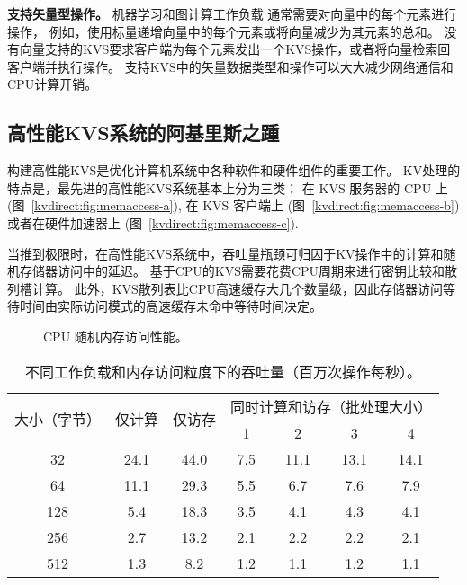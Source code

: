 \textbf {支持矢量型操作。}
机器学习和图计算工作负载\cite {li2014scaling,shao2013trinity,xiao17tux2} 通常需要对向量中的每个元素进行操作，
例如，使用标量递增向量中的每个元素或将向量减少为其元素的总和。
没有向量支持的KVS要求客户端为每个元素发出一个KVS操作，或者将向量检索回客户端并执行操作。
支持KVS中的矢量数据类型和操作可以大大减少网络通信和CPU计算开销。

\subsection{高性能KVS系统的阿基里斯之踵}
\label{kvdirect:sec:state-of-the-art-kvs}

构建高性能KVS是优化计算机系统中各种软件和硬件组件的重要工作。
KV处理的特点是，最先进的高性能KVS系统基本上分为三类：
在 KVS 服务器的 CPU 上
(图~\ref{kvdirect:fig:memaccess-a}),
在 KVS 客户端上
(图~\ref{kvdirect:fig:memaccess-b})
或者在硬件加速器上
(图~\ref{kvdirect:fig:memaccess-c}).

当推到极限时，在高性能KVS系统中，吞吐量瓶颈可归因于KV操作中的计算和随机存储器访问中的延迟。
基于CPU的KVS需要花费CPU周期来进行密钥比较和散列槽计算。
此外，KVS散列表比CPU高速缓存大几个数量级，因此存储器访问等待时间由实际访问模式的高速缓存未命中等待时间决定。

\begin{figure}[t]
	\centering
	\caption{CPU 随机内存访问性能。}
	\label{kvdirect:fig:cpu-mem}
\end{figure}

\begin{table}[htbp]
	\small
	\centering
	\label{kvdirect:tab:tput-unroll}
	\begin{tabular}{|c|c|c|c|c|c|c|}
		\hline
		\multirow{2}{*}{大小（字节）} & \multirow{2}{*}{仅计算} & \multirow{2}{*}{仅访存} & \multicolumn{4}{c|}{同时计算和访存（批处理大小）} \\\cline{4-7} 
		&  & & 1 & 2 & 3 & 4 \\\hline
		32 & 24.1 & 44.0 & 7.5 & 11.1 & 13.1 & 14.1 \\\hline
		64 & 11.1 & 29.3 & 5.5 & 6.7 & 7.6 & 7.9 \\\hline
		128 & 5.4 & 18.3 & 3.5 & 4.1 & 4.3 & 4.1 \\\hline
		256 & 2.7 & 13.2 & 2.1 & 2.2 & 2.2 & 2.1 \\\hline
		512 & 1.3 & 8.2 & 1.2 & 1.1 & 1.2 & 1.1 \\\hline
	\end{tabular}
	\caption{不同工作负载和内存访问粒度下的吞吐量（百万次操作每秒）。}
	\label{kvdirect:tab:kv-cpu-throughput}
\end{table}

